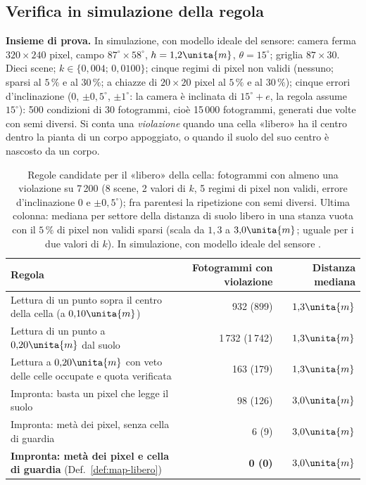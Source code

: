 \subsection{Verifica in simulazione della regola}\label{sec:map-banco}

\textbf{Insieme di prova.} In simulazione, con modello ideale del sensore: camera ferma $320\times240$ pixel, campo $87^\circ\times58^\circ$, $h=1{,}2\unita{m}$, $\theta=15^\circ$; griglia $87\times30$. Dieci scene; $k\in\{0{,}004;\,0{,}0100\}$; cinque regimi di pixel non validi (nessuno; sparsi al $5\,\%$ e al $30\,\%$; a chiazze di $20\times20$ pixel al $5\,\%$ e al $30\,\%$); cinque errori d'inclinazione ($0$, $\pm0{,}5^\circ$, $\pm1^\circ$: la camera è inclinata di $15^\circ+e$, la regola assume $15^\circ$): 500 condizioni di 30 fotogrammi, cioè 15\,000 fotogrammi, generati due volte con semi diversi. Si conta una \emph{violazione} quando una cella «libero» ha il centro dentro la pianta di un corpo appoggiato, o quando il suolo del suo centro è nascosto da un corpo.

\begin{table}[t]\centering\small
\caption{Regole candidate per il «libero» della cella: fotogrammi con almeno una violazione su 7\,200 (8 scene, 2 valori di $k$, 5 regimi di pixel non validi, errore d'inclinazione $0$ e $\pm0{,}5^\circ$); fra parentesi la ripetizione con semi diversi. Ultima colonna: mediana per settore della distanza di suolo libero in una stanza vuota con il $5\,\%$ di pixel non validi sparsi (scala da $1{,}3$ a $3{,}0\unita{m}$; uguale per i due valori di $k$). In simulazione, con modello ideale del sensore .}\label{tab:map-regole}
\begin{tabularx}{\linewidth}{Lrr}
\toprule
Regola & Fotogrammi con violazione & Distanza mediana \\
\midrule
Lettura di un punto sopra il centro della cella (a $0{,}10\unita{m}$) & 932 (899) & $1{,}3\unita{m}$\\
Lettura di un punto a $0{,}20\unita{m}$ dal suolo & 1\,732 (1\,742) & $1{,}3\unita{m}$\\
Lettura a $0{,}20\unita{m}$ con veto delle celle occupate e quota verificata & 163 (179) & $1{,}3\unita{m}$\\
Impronta: basta un pixel che legge il suolo & 98 (126) & $3{,}0\unita{m}$\\
Impronta: metà dei pixel, senza cella di guardia & 6 (9) & $3{,}0\unita{m}$\\
\textbf{Impronta: metà dei pixel e cella di guardia} (Def.~\ref{def:map-libero}) & \textbf{0 (0)} & $3{,}0\unita{m}$\\
\bottomrule
\end{tabularx}
\end{table}

